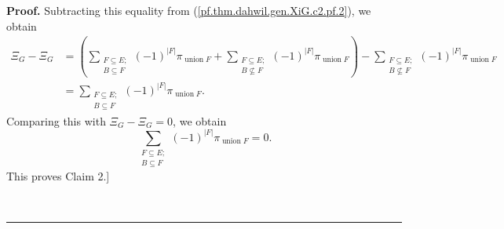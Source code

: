 \documentclass[numbers=enddot,12pt,final,onecolumn,notitlepage]{scrartcl}%
\theoremstyle{definition}
\newenvironment{proof}[1][Proof]{\noindent\textbf{#1.} }{\ \rule{0.5em}{0.5em}}
\newenvironment{verlong}{}{}
\let\sumnonlimits\sum
\renewcommand{\sum}{\sumnonlimits\limits}
\begin{document}
\begin{proof}
\begin{verlong}
Subtracting this equality from (\ref{pf.thm.dahwil.gen.XiG.c2.pf.2}), we
obtain%
\begin{align*}
\Xi_{G}-\Xi_{G}  &  =\left(  \sum_{\substack{F\subseteq E;\\B\subseteq
F}}\left(  -1\right)  ^{\left\vert F\right\vert }\pi_{\operatorname*{union}%
F}+\sum_{\substack{F\subseteq E;\\B\not \subseteq F}}\left(  -1\right)
^{\left\vert F\right\vert }\pi_{\operatorname*{union}F}\right)  -\sum
_{\substack{F\subseteq E;\\B\not \subseteq F}}\left(  -1\right)  ^{\left\vert
F\right\vert }\pi_{\operatorname*{union}F}\\
&  =\sum_{\substack{F\subseteq E;\\B\subseteq F}}\left(  -1\right)
^{\left\vert F\right\vert }\pi_{\operatorname*{union}F}.
\end{align*}
Comparing this with $\Xi_{G}-\Xi_{G}=0$, we obtain%
\[
\sum_{\substack{F\subseteq E;\\B\subseteq F}}\left(  -1\right)  ^{\left\vert
F\right\vert }\pi_{\operatorname*{union}F}=0.
\]
This proves Claim 2.]
\end{verlong}


\end{proof}
\end{document}
